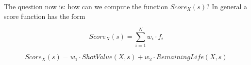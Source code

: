 The question now is: how can we compute the function $Score_X(s)$? In general a score
function has the form

\begin{equation}
  Score_X(s) = \sum_{i=1}^N w_i \cdot f_i
\end{equation}


\begin{equation}
  Score_X(s) = w_1 \cdot ShotValue(X,s) + w_2 \cdot RemainingLife(X,s)
  \label{eq:heuristicscore}
\end{equation}


